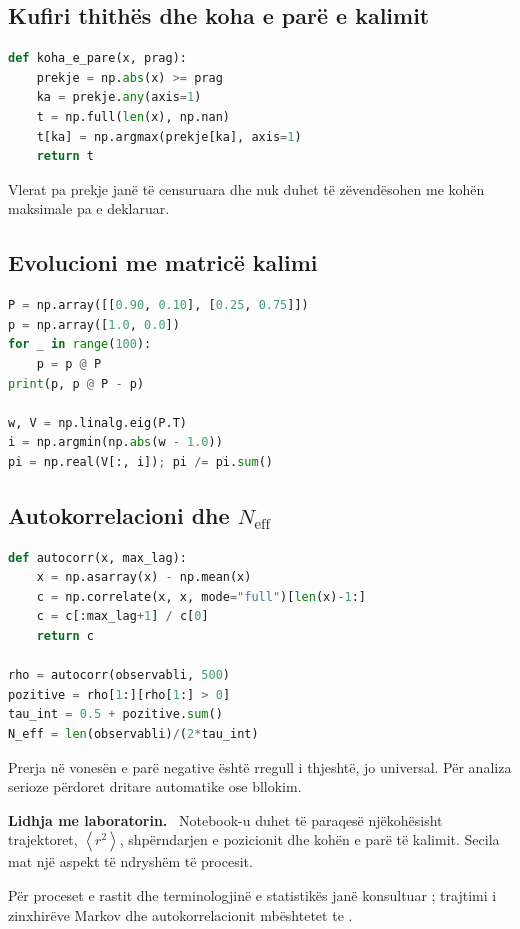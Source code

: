 \documentclass[11pt,oneside,openany]{book}
\newcommand{\avg}[1]{\left\langle #1\right\rangle}
\newenvironment{lidhje}{\par\medskip\noindent\textbf{Lidhja me laboratorin.}\ }{\par\medskip}
\begin{document}
\subsection{Kufiri thithës dhe koha e parë e kalimit}
\begin{lstlisting}[language=Python]
def koha_e_pare(x, prag):
    prekje = np.abs(x) >= prag
    ka = prekje.any(axis=1)
    t = np.full(len(x), np.nan)
    t[ka] = np.argmax(prekje[ka], axis=1)
    return t
\end{lstlisting}
Vlerat pa prekje janë të censuruara dhe nuk duhet të zëvendësohen me kohën maksimale pa e deklaruar.

\subsection{Evolucioni me matricë kalimi}
\begin{lstlisting}[language=Python,caption={Shpërndarja stacionare e një zinxhiri të fundmë.}]
P = np.array([[0.90, 0.10], [0.25, 0.75]])
p = np.array([1.0, 0.0])
for _ in range(100):
    p = p @ P
print(p, p @ P - p)

w, V = np.linalg.eig(P.T)
i = np.argmin(np.abs(w - 1.0))
pi = np.real(V[:, i]); pi /= pi.sum()
\end{lstlisting}

\subsection{Autokorrelacioni dhe $N_{\mathrm{eff}}$}
\begin{lstlisting}[language=Python,caption={Vlerësim fillestar i kohës së integruar të autokorrelacionit.}]
def autocorr(x, max_lag):
    x = np.asarray(x) - np.mean(x)
    c = np.correlate(x, x, mode="full")[len(x)-1:]
    c = c[:max_lag+1] / c[0]
    return c

rho = autocorr(observabli, 500)
pozitive = rho[1:][rho[1:] > 0]
tau_int = 0.5 + pozitive.sum()
N_eff = len(observabli)/(2*tau_int)
\end{lstlisting}
Prerja në vonesën e parë negative është rregull i thjeshtë, jo universal. Për analiza serioze përdoret dritare automatike ose bllokim.

\begin{lidhje}
Notebook-u duhet të paraqesë njëkohësisht trajektoret, $\avg{r^2}$, shpërndarjen e pozicionit dhe kohën e parë të kalimit. Secila mat një aspekt të ndryshëm të procesit.
\end{lidhje}

Për proceset e rastit dhe terminologjinë e statistikës janë konsultuar \cite{capollari,butka,tasho}; trajtimi i zinxhirëve Markov dhe autokorrelacionit mbështetet te \cite{robert,krauth}.
\end{document}
